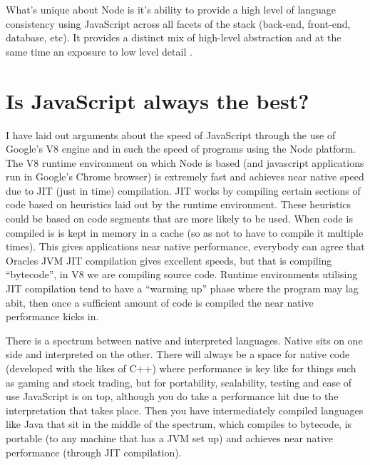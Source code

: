 \documentclass[12pt]{article} %
\begin{document}
What's unique about Node is it's ability to provide a high level of language consistency using JavaScript across all facets of the stack (back-end, front-end, database, etc). It provides a distinct mix of high-level abstraction and at the same time an exposure to low level detail \cite{1}.



\section{Is JavaScript always the best?}
I have laid out arguments about the speed of JavaScript through the use of Google's V8 engine and in such the speed of programs using the Node platform.
The V8 runtime environment on which Node is based (and javascript applications run in Google's Chrome browser) is extremely fast and achieves near native speed due to JIT (just in time) compilation. JIT works by compiling certain sections of code based on heuristics laid out by the runtime environment. These heuristics could be based on code segments that are more likely to be used. When code is compiled is is kept in memory in a cache (so as not to have to compile it multiple times). This gives applications near native performance, everybody can agree that Oracles JVM JIT compilation gives excellent speeds, but that is compiling ``bytecode'', in V8 we are compiling source code. Runtime environments utilising JIT compilation tend to have a ``warming up'' phase where the program may lag abit, then once a sufficient amount of code is compiled the near native performance kicks in.

There is a spectrum between native and interpreted languages. Native sits on one side and interpreted on the other.
There will always be a space for native code (developed with the likes of C++) where performance is key like for things such as gaming and stock trading, but for portability, scalability, testing and ease of use JavaScript is on top, although you do take a performance hit due to the interpretation that takes place.
Then you have intermediately compiled languages like Java that sit in the middle of the spectrum, which compiles to bytecode, is portable (to any machine that has a JVM set up) and achieves near native performance (through JIT compilation). 
\end{document}

